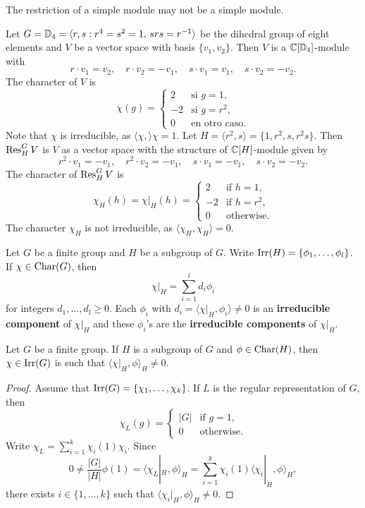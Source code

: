 The restriction of a simple module may not be a simple module. 

\begin{example}
    Let $G=\mathbb{D}_4=\langle r,s:r^4=s^2=1,\,srs=r^{-1}\rangle$ be the dihedral
    group of eight elements and 
    $V$ be a vector space with basis $\{v_1,v_2\}$. Then 
    $V$ is a $\mathbb{C}[\mathbb{D}_4]$-module with 
    \[
    r\cdot v_1=v_2,\quad
    r\cdot v_2=-v_1,\quad
    s\cdot v_1=v_1,\quad
    s\cdot v_2=-v_2.
    \]
    The character of $V$ is 
    \[
    \chi(g)=\begin{cases}
    2 & \text{si $g=1$},\\
    -2 & \text{si $g=r^2$},\\
    0 & \text{en otro caso}.
    \end{cases}
    \]
    Note that $\chi$ is irreducible, as $\langle\chi,\rangle\chi=1$.
    Let 
    $H=\langle r^2,s\rangle=\{1,r^2,s,r^2s\}$. Then $\operatorname{Res}_H^GV$ is $V$ as
    a vector space with the structure of 
    $\mathbb{C}[H]$-module given by 
    \[
    r^2\cdot v_1=-v_1,\quad
    r^2\cdot v_2=-v_1,\quad
    s\cdot v_1=-v_1,\quad
    s\cdot v_2=-v_2.
    \]
    The character of $\operatorname{Res}_H^GV$ is
    \[
    \chi_H(h)=\chi|_H(h)
    =\begin{cases}
    2 & \text{if $h=1$},\\
    -2 & \text{if $h=r^2$},\\
    0 & \text{otherwise}.
    \end{cases}
    \]
    The character $\chi_H$ is not irreducible, as 
    $\langle\chi_H,\chi_H\rangle=0$. 
\end{example}

Let $G$ be a finite group and 
$H$ be a subgroup of $G$. Write 
$\operatorname{Irr}(H)=\{\phi_1,\dots,\phi_l\}$.
If $\chi\in\operatorname{Char}(G)$, then
\[
    \chi|_H=\sum_{i=1}^ld_i\phi_i
\]
for integers $d_1,\dots,d_l\geq 0$. 
Each $\phi_i$ with $d_i=\langle\chi|_H,\phi_i\rangle\ne 0$ 
is an \textbf{irreducible component} of $\chi|_H$ and these 
$\phi_i$'s are the \textbf{irreducible components} of 
$\chi|_H$. 

\begin{proposition}
    Let $G$ be a finite group. 
    If $H$ is a subgroup of $G$ and $\phi\in\operatorname{Char}(H)$, 
    then $\chi\in\operatorname{Irr}(G)$ 
    is such that $\langle\chi|_H,\phi\rangle_H\ne 0$.
\end{proposition}

\begin{proof}
    Assume that $\operatorname{Irr}(G)=\{\chi_1,\dots,\chi_k\}$. 
    If $L$ is the regular representation of $G$, then 
    \[
    \chi_L(g)=\begin{cases}
    |G| & \text{if $g=1$},\\
    0 & \text{otherwise}.
    \end{cases}
    \]
    Write $\chi_L=\sum_{i=1}^k\chi_i(1)\chi_i$. Since 
    \[
    0\ne \frac{|G|}{|H|}\phi(1)=\langle \chi_L|_H,\phi\rangle_H=\sum_{i=1}^k\chi_i(1)\langle\chi_i|_H,\phi\rangle_H,
    \]
    there exists $i\in\{1,\dots,k\}$ 
    such that $\langle\chi_i|_H,\phi\rangle_H\ne 0$. 
\end{proof}

